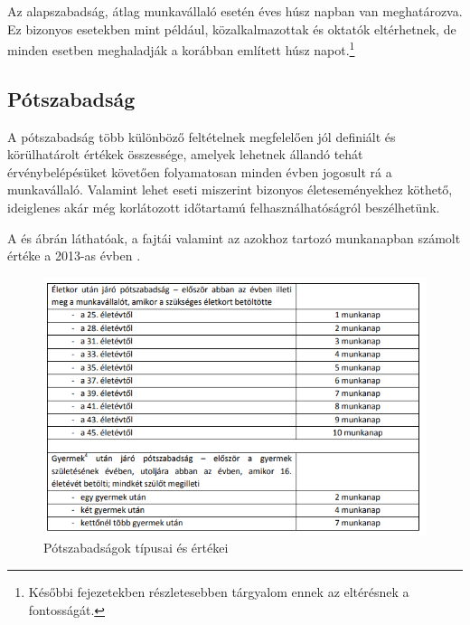 Az alapszabadság, átlag munkavállaló esetén éves húsz napban van meghatározva. Ez bizonyos esetekben mint például, közalkalmazottak és oktatók eltérhetnek, de minden esetben meghaladják a korábban említett húsz napot.\footnote{Későbbi fejezetekben részletesebben tárgyalom ennek az eltérésnek a fontosságát.}\cite{fizetettSzabadsag} \cite{alapszabadsag}

\subsection{Pótszabadság}   
A pótszabadság több különböző feltételnek megfelelően jól definiált és körülhatárolt értékek összessége, amelyek lehetnek állandó tehát érvénybelépésüket követően folyamatosan minden évben jogosult rá a munkavállaló.
Valamint lehet eseti miszerint bizonyos életeseményekhez köthető, ideiglenes akár még korlátozott időtartamú felhasználhatóságról beszélhetünk.

A  és  ábrán láthatóak, a fajtái valamint az azokhoz tartozó munkanapban számolt értéke a 2013-as évben\cite{fizetettSzabadsag} \cite{alapszabadsag}.

\begin{figure}[h]
	\centering
	\includegraphics[scale=0.8]{images/potszabadsagok_1.png}
	\caption{Pótszabadságok típusai és értékei}
	\label{fig:potszab1}
\end{figure}

